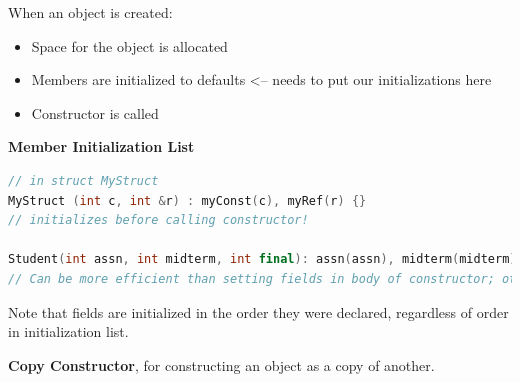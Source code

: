 \documentclass[english, 11pt]{article}
\begin{document}
When an object is created:
\begin{itemize}
  \item Space for the object is allocated
  \item Members are initialized to defaults <-- needs to put our initializations here
  \item Constructor is called
\end{itemize}

\textbf{Member Initialization List}

\begin{lstlisting}[language=c++]
// in struct MyStruct
MyStruct (int c, int &r) : myConst(c), myRef(r) {}
// initializes before calling constructor!

Student(int assn, int midterm, int final): assn(assn), midterm(midterm), final(final) {}
// Can be more efficient than setting fields in body of constructor; otherwise they are initialized by their default constructors and then reassigned in the body
\end{lstlisting}

Note that fields are initialized in the order they were declared, regardless of order in initialization list.

\textbf{Copy Constructor}, for constructing an object as a copy of another.
\end{document}
